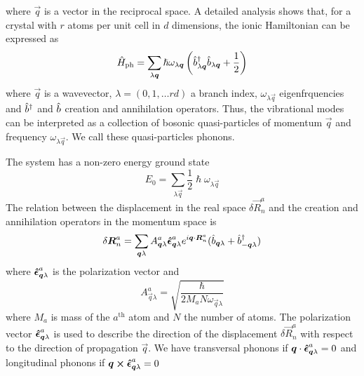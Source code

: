 where $\vec{q}$ is a vector in the reciprocal space. A detailed analysis shows that, for a crystal with $r$ atoms per unit cell in $d$ dimensions, the ionic Hamiltonian can be expressed as
\begin{equation} \label{eq:phonon_hamiltonian}
    \hat{H}_\text{ph} = \sum_{\lambda \mathbf{\boldsymbol{q}}} \hslash \omega_{\lambda\mathbf{\boldsymbol{q}}} \left( \hat{b}^\dagger_{\lambda \mathbf{\boldsymbol{q}}} \hat{b}_{\lambda \mathbf{\boldsymbol{q}}} + \frac{1}{2} \right)
\end{equation}
where $\vec{q}$ is a wavevector, $\lambda = (0,1,\dots rd)$ a branch index, $\omega_{\lambda \vec{q}}$ eigenfrquencies and $\hat{b}^\dagger$ and $\hat{b}$ creation and annihilation operators. Thus, the vibrational modes can be interpreted as a collection of bosonic quasi-particles of momentum $\vec{q}$ and frequency $\omega_{\lambda \vec{q}}$. We call these quasi-particles phonons.

The system has a non-zero energy ground state
\begin{equation}
    E_0 = \sum_{\lambda \vec{q}} \frac{1}{2} \hslash\omega_{\lambda\vec{q}}
\end{equation}
The relation between the displacement in the real space $\delta \vec{R}_n^a $ and the creation and annihilation operators in the momentum space is
\begin{equation} \label{eq:phonon_coordinates}
    \delta \mathbf{\boldsymbol{R}}_n^a = \sum_{\mathbf{\boldsymbol{q}}\lambda} A_{\mathbf{\boldsymbol{q}}\lambda}^a \mathbf{\boldsymbol{\hat{\epsilon}}}_{\mathbf{\boldsymbol{q}}\lambda}^a e^{i\mathbf{\boldsymbol{q}} \cdot \mathbf{\boldsymbol{R}}_n^a} (\hat{b}_{\mathbf{\boldsymbol{q}}\lambda} + \hat{b}^\dagger_{-\mathbf{\boldsymbol{q}}\lambda})
\end{equation}
where $\mathbf{\boldsymbol{\hat{\epsilon}}}_{\mathbf{\boldsymbol{q}}\lambda}^a$ is the polarization vector and
\begin{equation} \label{eq:A_phonon_constant}
    A_{\vec{q}\lambda}^a = \sqrt{\frac{\hslash}{2M_aN\omega_{\vec{q}\lambda}}}
\end{equation}
where $M_a$ is mass of the $a^\text{th}$ atom and $N$ the number of atoms. The polarization vector $\mathbf{\boldsymbol{\hat{\epsilon}}}_{\mathbf{\boldsymbol{q}}\lambda}^a$ is used to describe the direction of the displacement $\delta \vec{R}_n^a$ with respect to the direction of propagation $\vec{q}$. We have transversal phonons if $\mathbf{\boldsymbol{q}} \cdot \mathbf{\boldsymbol{\hat{\epsilon}}}_{\mathbf{\boldsymbol{q}}\lambda}^a = 0$ and longitudinal phonons if $\mathbf{\boldsymbol{q}} \cross \mathbf{\boldsymbol{\hat{\epsilon}}}_{\mathbf{\boldsymbol{q}}\lambda}^a = 0$

